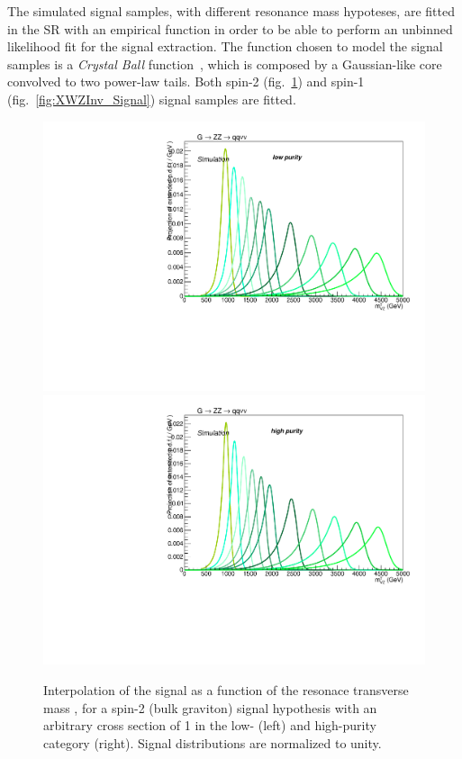The simulated signal samples, with different resonance mass hypoteses, are fitted in the SR with an empirical function in order to be able to perform an unbinned likelihood fit for the signal extraction. The function chosen to model the signal samples is a \emph{Crystal Ball} function~\cite{Oreglia:1980cs,Skwarnicki:1986xj}, which is composed by a Gaussian-like core convolved to two power-law tails. %
Both spin-2 (fig.~\ref{fig:XZZInv_Signal}) and spin-1 (fig.~\ref{fig:XWZInv_Signal}) signal samples are fitted.

\begin{figure}[!htb]
  \centering
    \includegraphics[width=.495\textwidth]{plotsAlpha_tesi/XVZnnlp/XZZInv_Signal.pdf}
    \includegraphics[width=.495\textwidth]{plotsAlpha_tesi/XVZnnhp/XZZInv_Signal.pdf}
  \caption{Interpolation of the signal as a function of the resonace transverse mass \mtVZ, for a spin-2 (bulk graviton) signal hypothesis with an arbitrary cross section of 1 \pb in the low- (left) and high-purity category (right). Signal distributions are normalized to unity.}
  \label{fig:XZZInv_Signal}
\end{figure}

